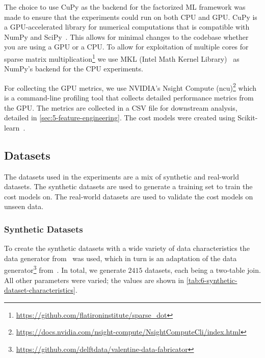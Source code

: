 The choice to use CuPy as the backend for the factorized ML framework was made to ensure that the experiments could run on both CPU and GPU. CuPy is a GPU-accelerated library for numerical computations that is compatible with NumPy and SciPy~\cite{cupy_learningsys2017}. This allows for minimal changes to the codebase whether you are using a GPU or a CPU. To allow for exploitation of multiple cores for sparse matrix multiplication\footnote{\url{https://github.com/flatironinstitute/sparse_dot}} we use MKL (Intel Math Kernel Library)~\cite{intel-mkl} as NumPy's backend for the CPU experiments.

For collecting the GPU metrics, we use NVIDIA's Nsight Compute (ncu)\footnote{\url{https://docs.nvidia.com/nsight-compute/NsightComputeCli/index.html}} which is a command-line profiling tool that collects detailed performance metrics from the GPU. The metrics are collected in a CSV file for downstream analysis, detailed in \autoref{sec:5-feature-engineering}. The cost models were created using Scikit-learn~\cite{scikit-learn}.

\subsection{Datasets}
\label{subsec:6-datasets}
The datasets used in the experiments are a mix of synthetic and real-world datasets. The synthetic datasets are used to generate a training set to train the cost models on. The real-world datasets are used to validate the cost models on unseen data.

\subsubsection{Synthetic Datasets}
To create the synthetic datasets with a wide variety of data characteristics the data generator from~\cite{amalur_tkde24} was used, which in turn is an adaptation of the data generator\footnote{\url{https://github.com/delftdata/valentine-data-fabricator}} from~\cite{valentine-data-generator}. In total, we generate $2415$ datasets, each being a two-table join. All other parameters were varied; the values are shown in \autoref{tab:6-synthetic-dataset-characteristics}.

